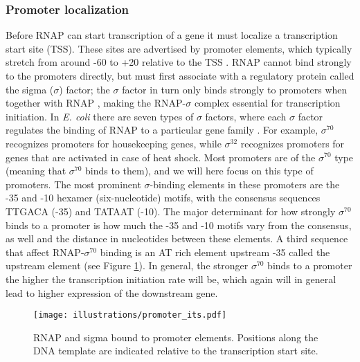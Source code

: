\subsubsection{Promoter localization}
Before RNAP can start transcription of a gene it must localize a transcription
start site (TSS). These sites are advertised by promoter elements, which
typically stretch from around -60 to +20 relative to the TSS
\cite{ross_third_1993,lilian_m_promoter_2002}. RNAP cannot bind strongly to the
promoters directly, but must first associate with a regulatory protein called
the sigma ($\sigma$) factor; the $\sigma$ factor in turn only binds strongly to
promoters when together with RNAP \cite{paget_70_2003}, making the
RNAP-$\sigma$ complex essential for transcription initiation. In \textit{E.
coli} there are seven types of $\sigma$ factors, where each $\sigma$ factor
regulates the binding of RNAP to a particular gene family
\cite{osterberg_regulation_2011}.  For example, $\sigma^{70}$ recognizes
promoters for housekeeping genes, while $\sigma^{32}$ recognizes promoters for
genes that are activated in case of heat shock. Most promoters are of the
$\sigma^{70}$ type (meaning that $\sigma^{70}$ binds to them), and we will here
focus on this type of promoters. The most prominent $\sigma$-binding elements
in these promoters are the -35 and -10 hexamer (six-nucleotide) motifs, with
the consensus sequences TTGACA (-35) and TATAAT (-10). The major determinant
for how strongly $\sigma^{70}$ binds to a promoter is how much the -35 and -10
motifs vary from the consensus, as well and the distance in nucleotides between
these elements. A third sequence that affect RNAP-$\sigma^{70}$ binding is an
AT rich element upstream -35 called the upstream element
\cite{ross_third_1993,haugen_fine_2008} (see Figure \ref{fig:promoter}). In
general, the stronger $\sigma^{70}$ binds to a promoter the higher the
transcription initiation rate will be, which again will in general lead to
higher expression of the downstream gene.

\begin{figure}[htb]
	\begin{center}
		\texttt{[image: illustrations/promoter\_its.pdf]}
	\end{center}
	\caption{RNAP and sigma bound to promoter elements. Positions along the DNA
	template are indicated relative to the transcription start site.}
	\label{fig:promoter}
\end{figure}

